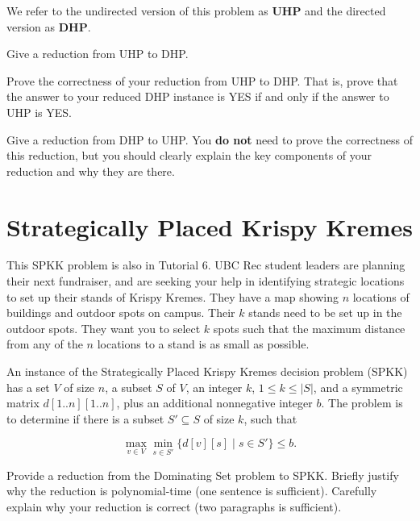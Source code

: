 We refer to the undirected version of this problem as \textbf{UHP} and the directed version as \textbf{DHP}.

\begin{questions}

    \question[3] Give a reduction from UHP to DHP.

    \ifsolutions\fi

    \question[4] Prove the correctness of your reduction from UHP to DHP. That is, prove that the answer to your reduced DHP instance is YES if and only if the answer to UHP is YES. 

    \ifsolutions\fi

    \question[7] Give a reduction from DHP to UHP. You \textbf{do not} need to prove the correctness of this reduction, but you should clearly explain the key components of your reduction and why they are there.

    \ifsolutions\fi

\section{Strategically Placed Krispy Kremes}

This SPKK problem is also in Tutorial 6. UBC Rec student leaders are planning their next fundraiser, and are seeking your help in identifying strategic locations to set up their stands of Krispy Kremes. They have a map showing $n$ locations of buildings and outdoor spots on campus. Their $k$ stands need to be set up in the outdoor spots. They want you to select $k$ spots such that the maximum distance from any of the $n$ locations to a stand is as small as possible.

An instance of the Strategically Placed Krispy Kremes decision problem (SPKK) has a set $V$ of size $n$, a subset $S$ of $V$, an integer $k$, $1\le k \le |S|$,  and a symmetric matrix $d[1..n][1..n]$, plus an additional nonnegative integer $b$. The problem is to determine if there is a subset $S' \subseteq S$ of size $k$, such that

\[
\max_{v \in V} \min_{s \in S'} \{ d[v][s] \;|\; s \in S' \} \le b.
\]

\begin{questions}
\question[8]
Provide a reduction from the Dominating Set problem to SPKK.
Briefly justify why the reduction is polynomial-time (one sentence is sufficient). Carefully explain why your reduction is correct (two paragraphs is sufficient).

 
  \ifsolutions\fi
  \end{questions}


\end{questions}